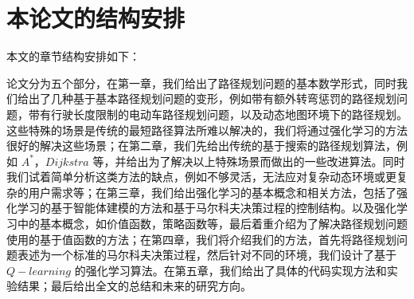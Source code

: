 \documentclass{standalone}
\begin{document}
\section{本论文的结构安排}
本文的章节结构安排如下：\par
论文分为五个部分，在第一章，我们给出了路径规划问题的基本数学形式，同时我们给出了几种基于基本路径规划问题的变形，例如带有额外转弯惩罚的路径规划问题，带有行驶长度限制的电动车路径规划问题，以及动态地图环境下的路径规划。这些特殊的场景是传统的最短路径算法所难以解决的，我们将通过强化学习的方法很好的解决这些场景；在第二章，我们先给出传统的基于搜索的路径规划算法，例如 $A^{*}$，$Dijkstra$ 等，并给出为了解决以上特殊场景而做出的一些改进算法。同时我们试着简单分析这类方法的缺点，例如不够灵活，无法应对复杂动态环境或更复杂的用户需求等；在第三章，我们给出强化学习的基本概念和相关方法，包括了强化学习的基于智能体建模的方法和基于马尔科夫决策过程的控制结构。以及强化学习中的基本概念，如价值函数，策略函数等，最后着重介绍为了解决路径规划问题使用的基于值函数的方法；在第四章，我们将介绍我们的方法，首先将路径规划问题表述为一个标准的马尔科夫决策过程，然后针对不同的环境，我们设计了基于 $Q-learning$ 的强化学习算法。在第五章，我们给出了具体的代码实现方法和实验结果；最后给出全文的总结和未来的研究方向。
\end{document}

